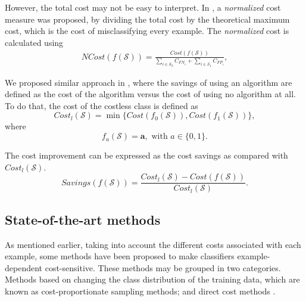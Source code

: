 However, the total cost may not be easy to interpret. In \citep{Whitrow2008}, a 
	\textit{normalized} cost measure was proposed, by dividing the total cost by the theoretical 
	maximum cost, which is the cost of misclassifying every example. The \textit{normalized} cost is 
	calculated using
  \begin{align}\label{eq:ncost}
    NCost(f(\mathcal{S})) = \frac{Cost(f(\mathcal{S}))}
    {\sum_{i \in \mathcal{S}_0} C_{FN_i} + 
    \sum_{i \in \mathcal{S}_1} C_{FP_i}},
  \end{align} 
  
	We proposed similar approach in \citep{CorreaBahnsen2014b}, where the savings of using an 
	algorithm  are defined as the cost of the algorithm versus the cost of using no algorithm at all. 
	To do that, the cost of the costless class is defined as 
	\begin{equation}
		Cost_l(\mathcal{S}) = \min \{Cost(f_0(\mathcal{S})), Cost(f_1(\mathcal{S}))\},
	\end{equation}
	where 
	\begin{equation}\label{eq:f_a}
		f_a(\mathcal{S}) = \mathbf{a}, \text{ with } a\in \{0,1\}.
	\end{equation}

	The cost improvement can be expressed as the cost savings as compared with $Cost_l(\mathcal{S})$. 
  \begin{equation}\label{eq:savings}
    Savings(f(\mathcal{S})) = \frac{ Cost_l(\mathcal{S}) - Cost(f(\mathcal{S}))}
		{Cost_l(\mathcal{S})}.
  \end{equation} 


\subsection{State-of-the-art methods}

	  As mentioned earlier, taking into account the different costs associated with each example, 
	  some methods have been proposed to make classifiers example-dependent cost-sensitive. These 
		methods may be grouped in two categories. Methods based on changing the class distribution of 
		the training data, which are known as cost-proportionate sampling methods; and direct cost 
		methods \citep{Wang2013}.
  
